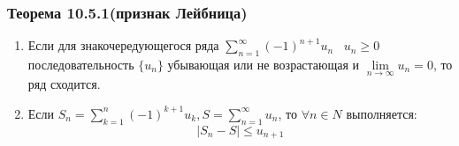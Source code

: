 \documentclass[12pt]{article}
\let\oldsum\sum
\let\oldlim\lim
\renewcommand{\sum}{\oldsum\limits}
\renewcommand{\lim}{\oldlim\limits}
\begin{document}
  \subsubsection*{Теорема 10.5.1(признак Лейбница)}\label{th:10.5.1}
  \par\noindent
  \begin{enumerate}
    \item Если для знакочередующегося ряда $\sum_{n=1}^{\infty} (-1)^{n+1} u_n \hspace{10pt} u_n \geq 0$
    последовательность $\{u_n\}$ убывающая или не возрастающая и $\lim_{n \to \infty} u_n =0$, то ряд сходится.

    \item Если $S_n = \sum_{k=1}^{n} (-1)^{k+1}u_k, S = \sum_{n=1}^{\infty} u_n$, то $\forall n \in N$ 
    выполняется:
    \[|S_n-S|\leq u_{n+1}\]
  \end{enumerate}
\end{document}
